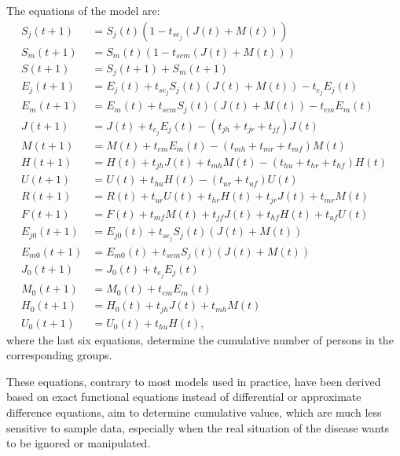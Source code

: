 \documentclass[
	11pt, %
	fleqn, %
	a4paper, %
]{LegrandOrangeBook}
\begin{document}
The equations of the model are:
\begin{align}
S_j(t+1) &= S_j(t)(1-t_{se_j}(J(t) + M(t))) \label{eq:covid1}\\
S_m(t+1) &= S_m(t)(1-t_{sem}(J(t) + M(t))) \label{eq:covid2}\\
S(t+1) &= S_j(t+1) + S_m(t+1) \label{eq:covid3}\\
E_j(t+1) &= E_j(t) + t_{se_j}S_j(t)(J(t) + M(t)) - t_{e_j}E_j(t) \label{eq:covid4}\\
E_m(t+1) &= E_m(t) + t_{sem}S_j(t)(J(t) + M(t)) - t_{em}E_m(t) \label{eq:covid5}\\
J(t+1) &= J(t) + t_{e_j}E_j(t) - (t_{jh} + t_{jr} + t_{jf})J(t) \label{eq:covid6}\\
M(t+1) &= M(t) + t_{em}E_m(t) - (t_{mh} + t_{mr} + t_{mf})M(t) \label{eq:covid7}\\
H(t+1) &= H(t) + t_{jh}J(t) + t_{mh}M(t) - (t_{hu} + t_{hr} + t_{hf})H(t) \label{eq:covid8}\\
U(t+1) &= U(t) + t_{hu}H(t) - (t_{ur} + t_{uf})U(t) \label{eq:covid9}\\
R(t+1) &= R(t) + t_{ur}U(t) + t_{hr}H(t) + t_{jr}J(t) + t_{mr}M(t) \label{eq:covid10}\\
F(t+1) &= F(t) + t_{mf}M(t) + t_{jf}J(t) + t_{hf}H(t) + t_{uf}U(t) \label{eq:covid11}\\
E_{j0}(t+1) &= E_{j0}(t) + t_{se_j}S_j(t)(J(t) + M(t)) \label{eq:covid12}\\
E_{m0}(t+1) &= E_{m0}(t) + t_{sem}S_j(t)(J(t) + M(t)) \label{eq:covid13}\\
J_0(t+1) &= J_0(t) + t_{e_j}E_j(t) \label{eq:covid14}\\
M_0(t+1) &= M_0(t) + t_{em}E_m(t) \label{eq:covid15}\\
H_0(t+1) &= H_0(t) + t_{jh}J(t) + t_{mh}M(t) \label{eq:covid16}\\
U_0(t+1) &= U_0(t) + t_{hu}H(t), \label{eq:covid17}
\end{align}
where the last six equations, determine the cumulative number of persons in the corresponding groups.

These equations, contrary to most models used in practice, have been derived based on exact functional equations instead of differential or approximate difference equations, aim to determine cumulative values, which are much less sensitive to sample data, especially when the real situation of the disease wants to be ignored or manipulated.
\end{document}
